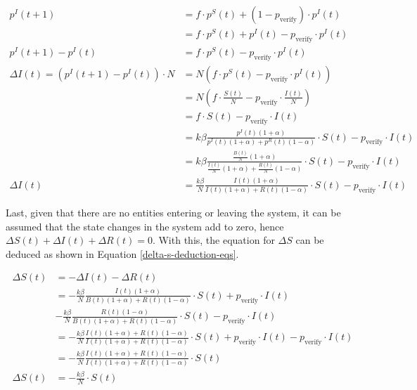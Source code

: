 \begin{align}
    p^I(t+1) &= f \cdot p^S(t) + (1 - p_{{\mathrm{verify}}})\cdot p^I(t) \nonumber\\
     &= f \cdot p^S(t) + p^I(t) - p_{{\mathrm{verify}}}\cdot p^I(t) \nonumber\\
    p^I(t+1) - p^I(t) &= f \cdot p^S(t) - p_{{\mathrm{verify}}}\cdot p^I(t) \nonumber\\
    \Delta I(t) = (p^I(t+1) - p^I(t)) \cdot N 
    &= N (f \cdot p^S(t) - p_{{\mathrm{verify}}}\cdot p^I(t)) \nonumber\\
    &= N (f \cdot \frac{S(t)}{N}  - p_{{\mathrm{verify}}}\cdot \frac{I(t)}{N}) \nonumber\\
    &= f \cdot S(t) - p_{{\mathrm{verify}}}\cdot I(t) \nonumber\\
    &=  k\beta \frac{p^I(t)(1+\alpha)}{p^I(t)(1+\alpha)+p^R(t)(1-\alpha)}
     \cdot S(t) - p_{{\mathrm{verify}}}\cdot I(t) \nonumber\\
    &=  k\beta \frac{\frac{B(t)}{N}(1+\alpha)}{\frac{I(t)}{N}(1+\alpha)+\frac{R(t)}{N}(1-\alpha)}
     \cdot S(t) - p_{{\mathrm{verify}}}\cdot I(t) \nonumber\\
     \Delta I(t) &=  \frac{k\beta}{N} \frac{I(t)(1+\alpha)}{I(t)(1+\alpha)+R(t)(1-\alpha)}
     \cdot S(t) - p_{{\mathrm{verify}}}\cdot I(t) \label{delta-i-deduction-eqs}
\end{align}

Last, given that there are no entities entering or leaving the system,
it can be assumed that the state changes in the system add to zero,
hence $\Delta S(t)+ \Delta I(t)+ \Delta R(t) = 0$. With this, the equation for
$\Delta S$ can be deduced as shown in Equation \ref{delta-s-deduction-eqs}.

\begin{align}
    \Delta S(t) &= - \Delta I(t) - \Delta R(t) \nonumber\\
     &= -\frac{k\beta}{N} \frac{I(t)(1+\alpha)}{B(t)(1+\alpha)+R(t)(1-\alpha)}
     \cdot S(t) + p_{{\mathrm{verify}}}\cdot I(t) \nonumber\\
      & -\frac{k\beta}{N} \frac{R(t)(1-\alpha)}{B(t)(1+\alpha)+R(t)(1-\alpha)} 
      \cdot S(t) - p_{{\mathrm{verify}}}\cdot I(t) \nonumber\\
      &= -\frac{k\beta}{N} \frac{I(t)(1+\alpha) + R(t)(1-\alpha)}{I(t)(1+\alpha)+R(t)(1-\alpha)}
      \cdot S(t) + p_{{\mathrm{verify}}}\cdot I(t) - p_{{\mathrm{verify}}}\cdot I(t) \nonumber\\
      &= -\frac{k\beta}{N} \frac{I(t)(1+\alpha) + R(t)(1-\alpha)}{I(t)(1+\alpha)+R(t)(1-\alpha)}
      \cdot S(t) \nonumber\\
      \Delta S(t) &= -\frac{k\beta}{N} \cdot S(t) \label{delta-s-deduction-eqs}
\end{align}


